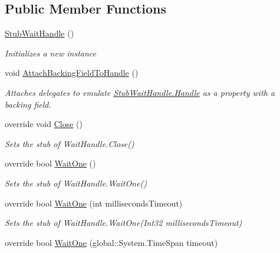 \subsection*{Public Member Functions}
\begin{DoxyCompactItemize}
\item 
\hyperlink{class_system_1_1_threading_1_1_fakes_1_1_stub_wait_handle_a081f9a9e578e94369557fc62b43b14cd}{Stub\-Wait\-Handle} ()
\begin{DoxyCompactList}\small\item\em Initializes a new instance\end{DoxyCompactList}\item 
void \hyperlink{class_system_1_1_threading_1_1_fakes_1_1_stub_wait_handle_a5dac91ffc094771704ebc808c1e2d667}{Attach\-Backing\-Field\-To\-Handle} ()
\begin{DoxyCompactList}\small\item\em Attaches delegates to emulate \hyperlink{class_system_1_1_threading_1_1_fakes_1_1_stub_wait_handle_a42a510b962c6a0a943f1486f496a94ed}{Stub\-Wait\-Handle.\-Handle} as a property with a backing field.\end{DoxyCompactList}\item 
override void \hyperlink{class_system_1_1_threading_1_1_fakes_1_1_stub_wait_handle_a75bca2f832c4315f2cd89755a21e03f8}{Close} ()
\begin{DoxyCompactList}\small\item\em Sets the stub of Wait\-Handle.\-Close()\end{DoxyCompactList}\item 
override bool \hyperlink{class_system_1_1_threading_1_1_fakes_1_1_stub_wait_handle_a6c215d10c9dd60270603d350697c8df1}{Wait\-One} ()
\begin{DoxyCompactList}\small\item\em Sets the stub of Wait\-Handle.\-Wait\-One()\end{DoxyCompactList}\item 
override bool \hyperlink{class_system_1_1_threading_1_1_fakes_1_1_stub_wait_handle_a2adedba6e0e5e6b04850fb22145d7eca}{Wait\-One} (int milliseconds\-Timeout)
\begin{DoxyCompactList}\small\item\em Sets the stub of Wait\-Handle.\-Wait\-One(\-Int32 milliseconds\-Timeout)\end{DoxyCompactList}\item 
override bool \hyperlink{class_system_1_1_threading_1_1_fakes_1_1_stub_wait_handle_af3c36a1ed0d5358d105330a0fbdd5c48}{Wait\-One} (global\-::\-System.\-Time\-Span timeout)

\end{DoxyCompactItemize}
